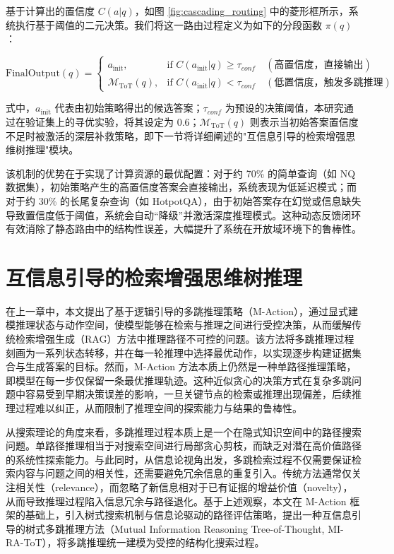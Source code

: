基于计算出的置信度 $C(a|q)$，如图 \ref{fig:cascading_routing} 中的菱形框所示，系统执行基于阈值的二元决策。我们将这一路由过程定义为如下的分段函数 $\pi(q)$：

\begin{equation}
\text{FinalOutput}(q) = 
\begin{cases} 
a_{\text{init}}, & \text{if } C(a_{\text{init}}|q) \ge \tau_{conf} \quad (\text{高置信度，直接输出}) \\
\mathcal{M}_{\text{ToT}}(q), & \text{if } C(a_{\text{init}}|q) < \tau_{conf} \quad (\text{低置信度，触发多跳推理})
\end{cases}
\end{equation}

式中，$a_{\text{init}}$ 代表由初始策略得出的候选答案；$\tau_{conf}$ 为预设的决策阈值，本研究通过在验证集上的寻优实验，将其设定为 0.6；$\mathcal{M}_{\text{ToT}}(q)$ 则表示当初始答案置信度不足时被激活的深层补救策略，即下一节将详细阐述的"互信息引导的检索增强思维树推理"模块。

该机制的优势在于实现了计算资源的最优配置：对于约 70\% 的简单查询（如 NQ 数据集），初始策略产生的高置信度答案会直接输出，系统表现为低延迟模式；而对于约 30\% 的长尾复杂查询（如 HotpotQA），由于初始答案存在幻觉或信息缺失导致置信度低于阈值，系统会自动“降级”并激活深度推理模式。这种动态反馈闭环有效消除了静态路由中的结构性误差，大幅提升了系统在开放域环境下的鲁棒性。


\section{互信息引导的检索增强思维树推理}\label{sec:tot_reasoning}

在上一章中，本文提出了基于逻辑引导的多跳推理策略（M-Action），通过显式建模推理状态与动作空间，使模型能够在检索与推理之间进行受控决策，从而缓解传统检索增强生成（RAG）方法中推理路径不可控的问题。该方法将多跳推理过程刻画为一系列状态转移，并在每一轮推理中选择最优动作，以实现逐步构建证据集合与生成答案的目标。然而，M-Action 方法本质上仍然是一种单路径推理策略，即模型在每一步仅保留一条最优推理轨迹。这种近似贪心的决策方式在复杂多跳问题中容易受到早期决策误差的影响，一旦关键节点的检索或推理出现偏差，后续推理过程难以纠正，从而限制了推理空间的探索能力与结果的鲁棒性。

从搜索理论的角度来看，多跳推理过程本质上是一个在隐式知识空间中的路径搜索问题。单路径推理相当于对搜索空间进行局部贪心剪枝，而缺乏对潜在高价值路径的系统性探索能力。与此同时，从信息论视角出发，多跳检索过程不仅需要保证检索内容与问题之间的相关性，还需要避免冗余信息的重复引入。传统方法通常仅关注相关性（relevance），而忽略了新信息相对于已有证据的增益价值（novelty），从而导致推理过程陷入信息冗余与路径退化。基于上述观察，本文在 M-Action 框架的基础上，引入树式搜索机制与信息论驱动的路径评估策略，提出一种互信息引导的树式多跳推理方法（Mutual Information Reasoning Tree-of-Thought, MI-RA-ToT），将多跳推理统一建模为受控的结构化搜索过程。

